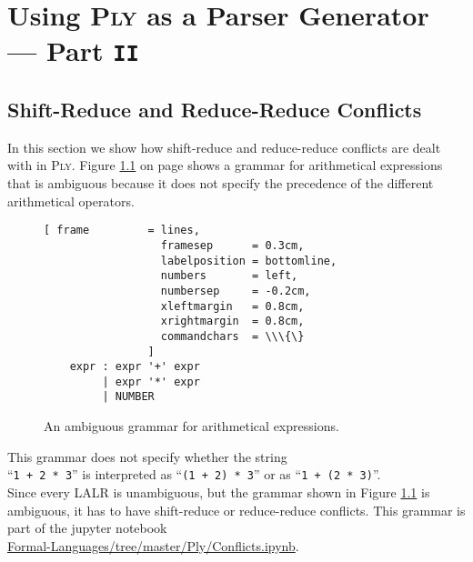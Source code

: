 \chapter{Using \textsc{Ply} as a Parser Generator  --- Part \texttt{II}}

\section{Shift-Reduce and Reduce-Reduce Conflicts}
In this section we show how shift-reduce and reduce-reduce conflicts are dealt with in \textsc{Ply}.
Figure \ref{fig:Conflicts.ipynb} on page \pageref{fig:Conflicts.ipynb} shows a grammar for arithmetical
expressions that is ambiguous because it does not specify the precedence of the different arithmetical
operators.  


\begin{figure}[!ht]
\centering
\begin{Verbatim}[ frame         = lines, 
                  framesep      = 0.3cm, 
                  labelposition = bottomline,
                  numbers       = left,
                  numbersep     = -0.2cm,
                  xleftmargin   = 0.8cm,
                  xrightmargin  = 0.8cm,
                  commandchars  = \\\{\}
                ]
    expr : expr '+' expr
         | expr '*' expr
         | NUMBER      
\end{Verbatim}
\vspace*{-0.3cm}
\caption{An ambiguous grammar for arithmetical expressions.}
\label{fig:Conflicts.ipynb}
\end{figure}
\FloatBarrier

\noindent
This grammar does not specify whether the string
\\[0.2cm]
\hspace*{1.3cm} 
``\texttt{1 + 2 * 3}'' \quad is interpreted as \quad  ``\texttt{(1 + 2) * 3}'' \quad or as \quad ``\texttt{1 +
  (2 * 3)}''. 
\\[0.2cm]
Since every LALR is unambiguous, but the grammar shown in Figure \ref{fig:Conflicts.ipynb} is ambiguous,  it
has to have shift-reduce or reduce-reduce conflicts.  This grammar is part of the jupyter notebook 
\\[0.2cm]
\hspace*{1.3cm}
\href{https://github.com/karlstroetmann/Formal-Languages/tree/master/Ply/Conflicts.ipynb}{Formal-Languages/tree/master/Ply/Conflicts.ipynb}.


